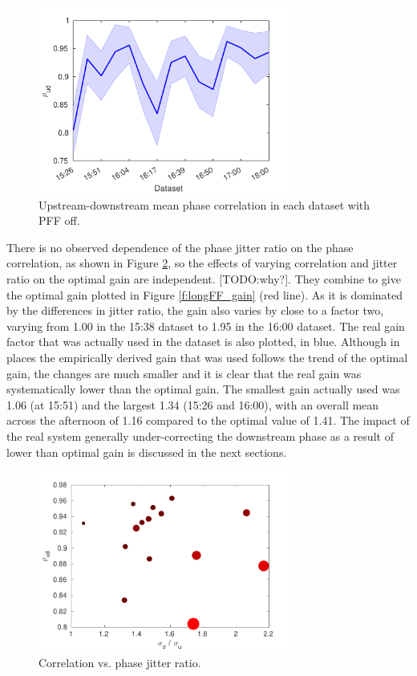 \begin{figure}
  \centering
  \includegraphics[width=0.75\textwidth]{Figures/feedforward/longFF_corrFFOff}
  \caption{Upstream-downstream mean phase correlation in each dataset with PFF off.}
  \label{f:longFF_corrFFOff}
\end{figure}

There is no observed dependence of the phase jitter ratio on the phase correlation, as shown in Figure \ref{f:longFF_corrVsJitRat}, so the effects of varying correlation and jitter ratio on the optimal gain are independent. [TODO:why?]. They combine to give the optimal gain plotted in Figure \ref{f:longFF_gain} (red line). As it is dominated by the differences in jitter ratio, the gain also varies by close to a factor two, varying from 1.00 in the 15:38 dataset to 1.95 in the 16:00 dataset. The real gain factor that was actually used in the dataset is also plotted, in blue. Although in places the empirically derived gain that was used follows the trend of the optimal gain, the changes are much smaller and it is clear that the real gain was systematically lower than the optimal gain. The smallest gain actually used was 1.06 (at 15:51) and the largest 1.34 (15:26 and 16:00), with an overall mean across the afternoon of 1.16 compared to the optimal value of 1.41. The impact of the real system generally under-correcting the downstream phase as a result of lower than optimal gain is discussed in the next sections.  

\begin{figure}
  \centering
  \includegraphics[width=0.75\textwidth]{Figures/feedforward/longFF_corrVsJitRat}
  \caption{Correlation vs. phase jitter ratio.}
  \label{f:longFF_corrVsJitRat}
\end{figure}


